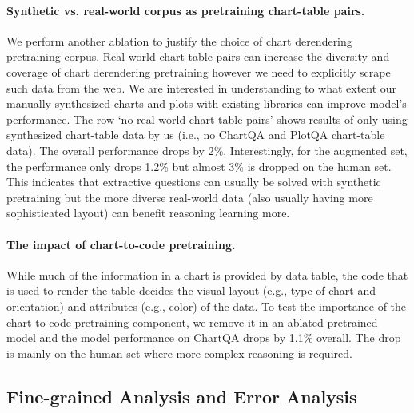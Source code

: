 \paragraph{Synthetic vs. real-world corpus as pretraining chart-table pairs.} 
We perform another ablation to justify the choice of chart derendering pretraining corpus. Real-world chart-table pairs can increase the diversity and coverage of chart derendering pretraining however we need to explicitly scrape such data from the web. We are interested in understanding to what extent our manually synthesized charts and plots with existing libraries can improve model's performance. The row `no real-world chart-table pairs' shows results of only using synthesized chart-table data by us (i.e., no ChartQA and PlotQA chart-table data). The overall performance drops by 2\%. Interestingly, for the augmented set, the performance only drops 1.2\% but almost 3\% is dropped on the human set. This indicates that extractive questions can usually be solved with synthetic pretraining but the more diverse real-world data (also usually having more sophisticated layout) can benefit reasoning learning more.

\paragraph{The impact of chart-to-code pretraining.} While much of the information in a chart is provided by data table, the code that is used to render the table decides the visual layout (e.g., type of chart and orientation) and attributes (e.g., color) of the data. To test the importance of the chart-to-code pretraining component, we remove it in an ablated pretrained model and the model performance on ChartQA drops by 1.1\% overall. The drop is mainly on the human set where more complex reasoning is required.

\subsection{Fine-grained Analysis and Error Analysis}\label{sec:finegrained_analysis}

